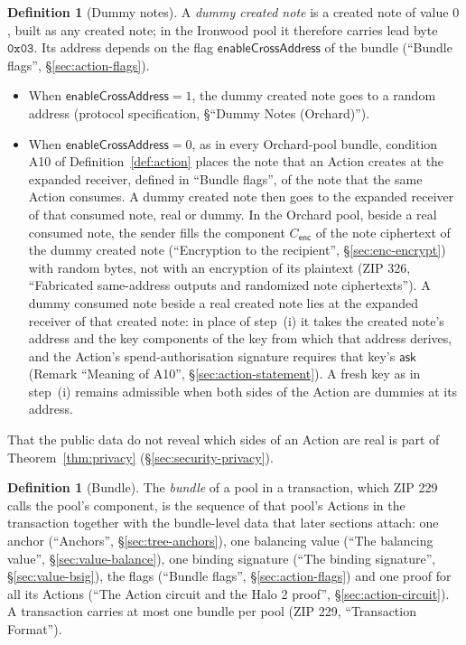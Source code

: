 \documentclass[11pt,a4paper]{article}
\theoremstyle{definition}
\newtheorem{definition}[theorem]{Definition}
\newcommand{\ask}{\ensuremath{\mathsf{ask}}}
\begin{document}
\begin{definition}[Dummy notes]
A \emph{dummy created note} is a created note of value $0$, built as any
created note; in the Ironwood pool it therefore carries lead byte
$\mathtt{0x03}$. Its address depends on the flag
$\mathsf{enableCrossAddress}$ of the bundle (``Bundle flags'',
\S\ref{sec:action-flags}).
\begin{itemize}
\item When $\mathsf{enableCrossAddress} = 1$, the dummy created note goes to
  a random address (protocol specification, \S``Dummy Notes (Orchard)'').
\item When $\mathsf{enableCrossAddress} = 0$, as in every Orchard-pool
  bundle, condition A10 of Definition~\ref{def:action} places the note that
  an Action creates at the expanded receiver, defined in ``Bundle flags'',
  of the note that the same Action consumes. A dummy created note then goes
  to the expanded receiver of that consumed note, real or dummy. In the
  Orchard pool, beside a real consumed note, the sender fills the component
  $C_{\mathsf{enc}}$ of the note ciphertext of the dummy created note
  (``Encryption to the recipient'', \S\ref{sec:enc-encrypt}) with random
  bytes, not with an encryption of its plaintext (ZIP 326, ``Fabricated
  same-address outputs and randomized note ciphertexts''). A dummy consumed
  note beside a real created note lies at the expanded receiver of that
  created note: in place of step~(i) it takes the created note's address and
  the key components of the key from which that address derives, and the
  Action's spend-authorisation signature requires that key's $\ask$ (Remark
  ``Meaning of A10'', \S\ref{sec:action-statement}). A fresh key as in
  step~(i) remains admissible when both sides of the Action are dummies at
  its address.
\end{itemize}
\end{definition}

That the public data do not reveal which sides of an Action are real is part
of Theorem~\ref{thm:privacy} (\S\ref{sec:security-privacy}).

\begin{definition}[Bundle]
The \emph{bundle} of a pool in a transaction, which ZIP 229 calls the pool's
component, is the sequence of that pool's Actions in the transaction
together with the bundle-level data that later sections attach: one anchor
(``Anchors'', \S\ref{sec:tree-anchors}), one balancing value (``The
balancing value'', \S\ref{sec:value-balance}), one binding signature (``The
binding signature'', \S\ref{sec:value-bsig}), the flags (``Bundle flags'',
\S\ref{sec:action-flags}) and one proof for all its Actions (``The Action
circuit and the Halo 2 proof'', \S\ref{sec:action-circuit}). A transaction
carries at most one bundle per pool (ZIP 229, ``Transaction Format'').
\end{definition}
\end{document}
